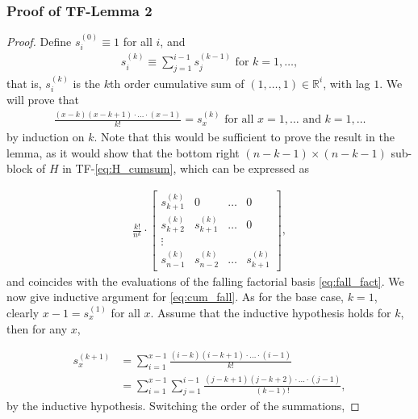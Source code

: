\documentclass[a4paper]{article}
\newcommand{\RR}{\mathbb{R}}
\begin{document}
\subsubsection{Proof of TF-Lemma 2}
\begin{proof}
Define $s_i^{(0)} \equiv 1$ for all $i$, and 
\begin{align*}
s_i^{(k)} \equiv \sum_{j=1}^{i-1}s_j^{(k-1)} \text{ for } k = 1,\ldots, 
\end{align*}
that is, $s_i^{(k)}$ is the $k$th order cumulative sum of $(1,\ldots, 1)\in\RR^i$, with lag $1$. We will prove that
\begin{align}
\frac{(x-k)(x-k+1)\cdot\ldots\cdot (x-1)}{k!} = s_x^{(k)} \text{ for all } x = 1,\ldots \text{ and } k = 1,\ldots
\label{eq:cum_fall}
\end{align}
by induction on $k$. Note that this would be sufficient to prove the result in the lemma, as it would show that the bottom right $(n-k-1)\times (n-k-1)$ sub-block of $H$ in TF-\eqref{eq:H_cumsum}, which can be expressed as

\begin{align*}
\frac{k!}{n^k}\cdot
\begin{bmatrix}
s_{k+1}^{(k)} & 0 & \ldots & 0\\
s_{k+2}^{(k)} & s_{k+1}^{(k)} & \ldots & 0\\
\vdots\\
s_{n-1}^{(k)} & s_{n-2}^{(k)} & \ldots & s_{k+1}^{(k)}
\end{bmatrix},
\end{align*}
and coincides with the evaluations of the falling factorial basis \eqref{eq:fall_fact}. We now give inductive argument for \eqref{eq:cum_fall}. As for the base case, $k = 1$, clearly $x - 1=s_x^{(1)}$ for all $x$. Assume that the inductive hypothesis holds for $k$, then for any $x$,

\begin{align*}
s_x^{(k+1)} &= \sum_{i=1}^{x-1}\frac{(i-k)(i-k+1)\cdot\ldots\cdot(i-1)}{k!}\\
&= \sum_{i=1}^{x-1}\sum_{j=1}^{i-1}\frac{(j-k+1)(j-k+2)\cdot\ldots\cdot(j-1)}{(k-1)!},
\end{align*}
by the inductive hypothesis. Switching the order of the summations, 


\end{proof}
\end{document}
